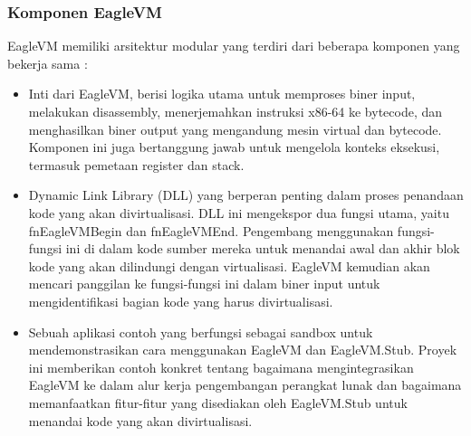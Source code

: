 \subsubsection{Komponen EagleVM}
EagleVM memiliki arsitektur modular yang terdiri dari beberapa komponen yang bekerja sama \cite{Eag21}:
\begin{itemize}
	\item {} Inti dari EagleVM, berisi logika utama untuk memproses biner input, melakukan disassembly, menerjemahkan instruksi x86-64 ke bytecode, dan menghasilkan biner output yang mengandung mesin virtual dan bytecode. Komponen ini juga bertanggung jawab untuk mengelola konteks eksekusi, termasuk pemetaan register dan stack.
	\item {} Dynamic Link Library (DLL) yang berperan penting dalam proses penandaan kode yang akan divirtualisasi. DLL ini mengekspor dua fungsi utama, yaitu fnEagleVMBegin dan fnEagleVMEnd. Pengembang menggunakan fungsi-fungsi ini di dalam kode sumber mereka untuk menandai awal dan akhir blok kode yang akan dilindungi dengan virtualisasi. EagleVM kemudian akan mencari panggilan ke fungsi-fungsi ini dalam biner input untuk mengidentifikasi bagian kode yang harus divirtualisasi.
	\item {} Sebuah aplikasi contoh yang berfungsi sebagai sandbox untuk mendemonstrasikan cara menggunakan EagleVM dan EagleVM.Stub. Proyek ini memberikan contoh konkret tentang bagaimana mengintegrasikan EagleVM ke dalam alur kerja pengembangan perangkat lunak dan bagaimana memanfaatkan fitur-fitur yang disediakan oleh EagleVM.Stub untuk menandai kode yang akan divirtualisasi.
\end{itemize}

